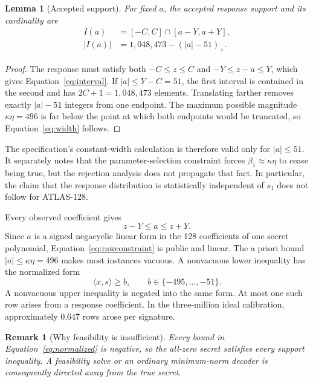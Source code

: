 \documentclass[11pt,a4paper]{article}
\newtheorem{lemma}[theorem]{Lemma}
\newtheorem{remark}[theorem]{Remark}
\begin{document}
\begin{lemma}[Accepted support]
\label{lem:support}
For fixed $a$, the accepted response support and its cardinality are
\begin{align}
 I(a)&=[-C,C]\cap[a-Y,a+Y],\label{eq:interval}\\
 |I(a)|&=1{,}048{,}473-(|a|-51)_+.\label{eq:width}
\end{align}
\end{lemma}

\begin{proof}
The response must satisfy both $-C\le z\le C$ and
$-Y\le z-a\le Y$, which gives Equation~\eqref{eq:interval}.  If
$|a|\le Y-C=51$, the first interval is contained in the second and has
$2C+1=1{,}048{,}473$ elements.  Translating farther removes exactly
$|a|-51$ integers from one endpoint.  The maximum possible magnitude
$\kappa\eta=496$ is far below the point at which both endpoints would be
truncated, so Equation~\eqref{eq:width} follows.
\end{proof}

The specification's constant-width calculation is therefore valid only for
$|a|\le51$.  It separately notes that the parameter-selection constraint
forces $\beta_1\approx\kappa\eta$ to cease being true, but the rejection
analysis does not propagate that fact.  In particular, the claim that the
response distribution is statistically independent of $s_1$ does not follow
for ATLAS-128.

Every observed coefficient gives
\begin{equation}
                     z-Y\le a\le z+Y.
\label{eq:rawconstraint}
\end{equation}
Since $a$ is a signed negacyclic linear form in the 128 coefficients of one
secret polynomial, Equation~\eqref{eq:rawconstraint} is public and linear.
The a priori bound $|a|\le\kappa\eta=496$ makes most instances vacuous.  A
nonvacuous lower inequality has the normalized form
\begin{equation}
                    \langle x,s\rangle\ge b,
                    \qquad b\in\{-495,\ldots,-51\}.
\label{eq:normalized}
\end{equation}
A nonvacuous upper inequality is negated into the same form.  At most one
such row arises from a response coefficient.  In the three-million ideal
calibration, approximately 0.647 rows arose per signature.

\begin{remark}[Why feasibility is insufficient]
Every bound in Equation~\eqref{eq:normalized} is negative, so the all-zero
secret satisfies every support inequality.  A feasibility solve or an
ordinary minimum-norm decoder is consequently directed away from the true
secret.
\end{remark}
\end{document}
